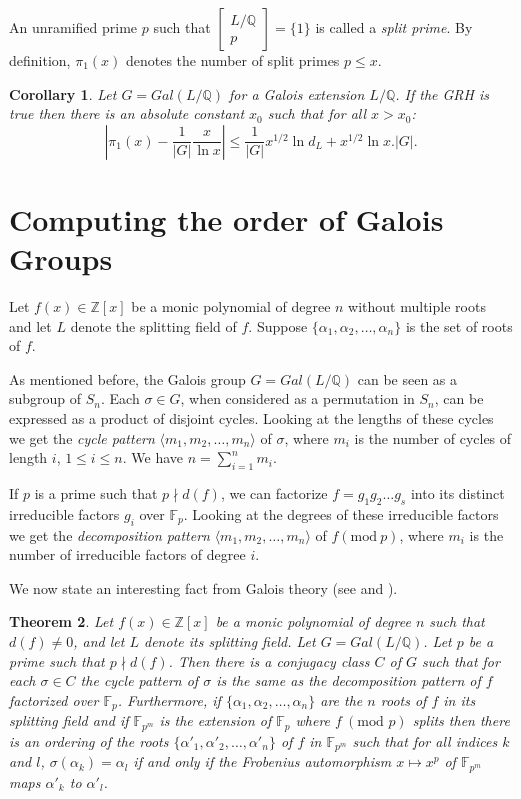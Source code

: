 \documentclass{article}
\newtheorem{theorem}{Theorem}[section]
\newtheorem{corollary}[theorem]{Corollary}
\newcommand{\Gal}[1]{\ensuremath{Gal\left(#1\right)}}
\newcommand{\Q}[0]{\ensuremath{\mathbb{Q}}}
\newcommand{\Z}[0]{\ensuremath{\mathbb{Z}}}
\newcommand{\F}[0]{\ensuremath{\mathbb{F}}}
\newcommand{\mod}[0]{\ensuremath{\mathrm{mod}\ }}
\renewcommand{\angle}[1]{\langle #1\rangle}
\newcommand{\Artin}[2]
{\ensuremath
  {\left[
      \begin{array}{c}
        #1\\
        \hline
        #2
      \end{array}
    \right]
  }
}
\begin{document}
An unramified prime $p$ such that $\Artin{L/\Q}{p}=\{1\}$ is called a
\emph{split prime}. By definition, $\pi_1(x)$ denotes the number of
split primes $p\leq x$.

\begin{corollary}\label{eff:split:primes}
  Let $G = \Gal{L/\Q}$ for a Galois extension $L/\Q$. If the GRH is
  true then there is an absolute constant $x_0$ such that for all $x >
  x_0$:
  \[
  \left|\pi_1(x) - \frac{1}{|G|} \frac{x}{\ln x} \right| \leq  \frac{1}{|G|}
    x^{1/2} \ln{d_L} + x^{1/2}\ln{x}. |G|.
  \]
\end{corollary}

\section{Computing the order of Galois Groups}\label{ordersection}

Let $f(x) \in \Z[x]$ be a monic polynomial of degree $n$ without
multiple roots and let $L$ denote the splitting field of $f$. Suppose
$\{\alpha_1,\alpha_2,\ldots,\alpha_n\}$ is the set of roots of $f$.

As mentioned before, the Galois group $G=\Gal{L/\Q}$ can be seen as a
subgroup of $S_n$. Each $\sigma\in G$, when considered as a
permutation in $S_n$, can be expressed as a product of disjoint
cycles.  Looking at the lengths of these cycles we get the \emph{cycle
  pattern} $\angle{m_1,m_2,\ldots,m_n}$ of $\sigma$, where $m_i$ is
the number of cycles of length $i$, $1\leq i\leq n$. We have
$n=\sum_{i=1}^n m_i$.

If $p$ is a prime such that $p \nmid d(f)$, we can factorize $f=
g_1 g_2\ldots g_s$ into its distinct irreducible factors $g_i$ over
$\F_p$. Looking at the degrees of these irreducible factors we get the
\emph{decomposition pattern} $\angle{m_1,m_2,\ldots,m_n}$ of $f (\mod
p)$, where $m_i$ is the number of irreducible factors of degree $i$.

We now state an interesting fact from Galois theory (see \cite[page
198]{waerden:1991} and \cite[Theorem 2.9, Chap. VII]{lang:algebra}).

\begin{theorem}\label{waerden}
  Let $f(x) \in \Z[x]$ be a monic polynomial of degree $n$ such that
  $d(f) \neq 0$, and let $L$ denote its splitting field. Let $G =
  \Gal{L/\Q}$. Let $p$ be a prime such that $p \nmid d(f)$. Then
  there is a conjugacy class $C$ of $G$ such that for each $\sigma \in
  C$ the cycle pattern of $\sigma$ is the same as the decomposition
  pattern of $f$ factorized over $\F_p$.  Furthermore, if
  $\{\alpha_1,\alpha_2,\ldots,\alpha_n\}$ are the $n$ roots of $f$ in
  its splitting field and if $\F_{p^m}$ is the extension of $\F_p$
  where $f\ (\textrm{mod } p)$ splits then there is an ordering of the
  roots $\{\alpha'_1,\alpha'_2,\ldots,\alpha'_n\}$ of $f$ in
  $\F_{p^m}$ such that for all indices $k$ and $l$,
  $\sigma(\alpha_k)=\alpha_l$ if and only if the Frobenius
  automorphism $x\mapsto x^p$ of $\F_{p^m}$ maps $\alpha'_k$ to
  $\alpha'_l$.
\end{theorem}
\end{document}
